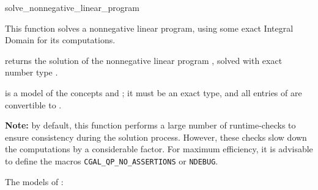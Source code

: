 \begin{ccRefFunction}{solve_nonnegative_linear_program}


This function solves a nonnegative linear program, using some exact
Integral Domain  for its computations.   

{returns the solution of the nonnegative linear program , solved
with exact number type .}

 is a model of the concepts  and
; it must
be an exact type, and all entries of  are convertible to 
.

{\bf Note:} by default, this function performs a large number of 
runtime-checks to ensure consistency during the solution process.
However, these checks slow down the computations by a considerable
factor. For maximum efficiency, it is advisable to define the macros
\texttt{CGAL\_QP\_NO\_ASSERTIONS} or \texttt{NDEBUG}.

\ccSeeAlso

The  models of :

\\
\\
\\
\end{ccRefFunction}
